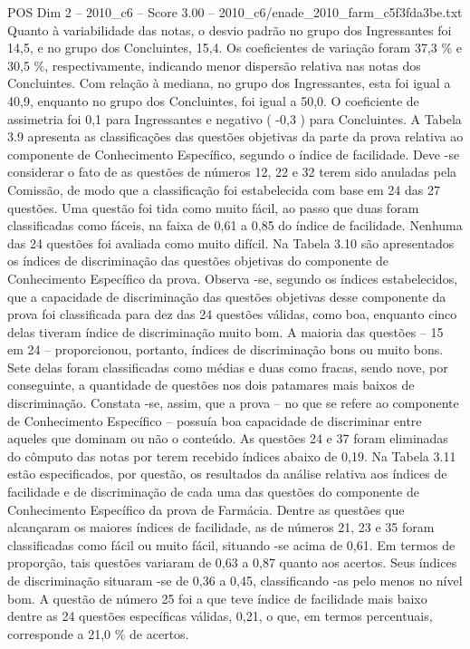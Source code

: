 \begin{textsample}{POS Dim 2 – 2010\_c6 – Score 3.00 – 2010\_c6/enade\_2010\_farm\_c5f3fda3be.txt}
Quanto à variabilidade das notas, o desvio padrão no grupo dos Ingressantes foi 14,5, e no grupo dos Concluintes, 15,4.
Os coeficientes de variação foram 37,3 \% e 30,5 \%, respectivamente, indicando menor dispersão relativa nas notas dos Concluintes.
Com relação à mediana, no grupo dos Ingressantes, esta foi igual a 40,9, enquanto no grupo dos Concluintes, foi igual a 50,0.
O coeficiente de assimetria foi 0,1 para Ingressantes e negativo ( -0,3 ) para Concluintes.
A Tabela 3.9 apresenta as classificações das questões objetivas da parte da prova relativa ao componente de Conhecimento Específico, segundo o índice de facilidade.
Deve -se considerar o fato de as questões de números 12, 22 e 32 terem sido anuladas pela Comissão, de modo que a classificação foi estabelecida com base em 24 das 27 questões.
Uma questão foi tida como muito fácil, ao passo que duas foram classificadas como fáceis, na faixa de 0,61 a 0,85 do índice de facilidade.
Nenhuma das 24 questões foi avaliada como muito difícil.
Na Tabela 3.10 são apresentados os índices de discriminação das questões objetivas do componente de Conhecimento Específico da prova.
Observa -se, segundo os índices estabelecidos, que a capacidade de discriminação das questões objetivas desse componente da prova foi classificada para dez das 24 questões válidas, como boa, enquanto cinco delas tiveram índice de discriminação muito bom.
A maioria das questões – 15 em 24 – proporcionou, portanto, índices de discriminação bons ou muito bons.
Sete delas foram classificadas como médias e duas como fracas, sendo nove, por conseguinte, a quantidade de questões nos dois patamares mais baixos de discriminação.
Constata -se, assim, que a prova – no que se refere ao componente de Conhecimento Específico – possuía boa capacidade de discriminar entre aqueles que dominam ou não o conteúdo.
As questões 24 e 37 foram eliminadas do cômputo das notas por terem recebido índices abaixo de 0,19.
Na Tabela 3.11 estão especificados, por questão, os resultados da análise relativa aos índices de facilidade e de discriminação de cada uma das questões do componente de Conhecimento Específico da prova de Farmácia.
Dentre as questões que alcançaram os maiores índices de facilidade, as de números 21, 23 e 35 foram classificadas como fácil ou muito fácil, situando -se acima de 0,61.
Em termos de proporção, tais questões variaram de 0,63 a 0,87 quanto aos acertos.
Seus índices de discriminação situaram -se de 0,36 a 0,45, classificando -as pelo menos no nível bom.
A questão de número 25 foi a que teve índice de facilidade mais baixo dentre as 24 questões específicas válidas, 0,21, o que, em termos percentuais, corresponde a 21,0 \% de acertos.

\end{textsample}
